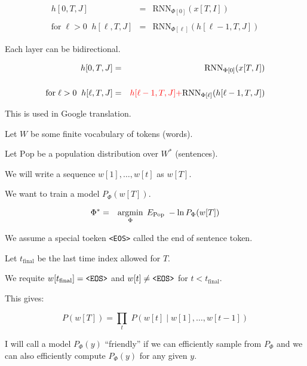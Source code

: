 {\begin{eqnarray*}
h[0,T,J] & = & \mathrm{RNN}_{\Phi[0]}(x[T,I]) \\
\\
\mbox{for} \;\ell > 0\;\;h[\ell,T,J] & = & \mathrm{RNN}_{\Phi[\ell]}(h[\ell-1,T,J])
\end{eqnarray*}

Each layer can be bidirectional.



\begin{eqnarray*}
h[0,T,J] & = & \mathrm{RNN}_{\Phi[0]}(x[T,I]) \\
\\
\mbox{for} \;\ell > 0\;\;h[\ell,T,J] & = & {\color{red} h[\ell-1,T,J] +} \mathrm{RNN}_{\Phi[\ell]}(h[\ell-1,T,J])
\end{eqnarray*}

\vfill
This is used in Google translation.


Let $W$ be some finite vocabulary of tokens (words).

\vfill
Let $\mathrm{Pop}$ be a population distribution over $W^*$ (sentences).

\vfill
We will write a sequence $w[1],\ldots,w[t]$ as $w[T]$.

\vfill
We want to train a model $P_\Phi(w[T])$.

\begin{eqnarray*}
\Phi^* & = & \operatorname*{argmin}_\Phi \; E_{\mathrm{Pop}}\;-\ln P_\Phi(w[T])
\end{eqnarray*}


\vfill
We assume a special toeken {\tt <EOS>} called the end of sentence token.

\vfill
Let $t_{\mathrm{final}}$ be the last time index allowed for $T$.

\vfill
We requite $w[t_{\mathrm{final}}] = \mbox{\tt <EOS>}$ and $w[t] \not = \mbox{\tt <EOS>}$ for $t < t_{\mathrm{final}}$.

\vfill
This gives:

$$P(w[T]) = \prod_t\;P(w[t]\;|\;w[1],\ldots,w[t-1])$$


I will call a model $P_\Phi(y)$ ``friendly'' if we can efficiently sample from $P_\Phi$ and we can also efficiently compute $P_\Phi(y)$ for any given $y$.

}

